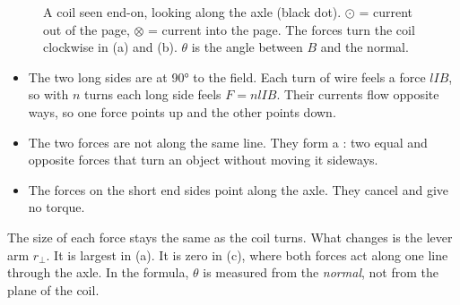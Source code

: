 \begin{figure}
  \caption{A coil seen end-on, looking along the axle (black dot). $\odot$ = current out
    of the page, $\otimes$ = current into the page. The forces turn the coil clockwise in
    (a) and (b). $\theta$ is the angle between $B$ and the normal.}\label{ch5:fig:endon}
\end{figure}

\begin{itemize}
  \item The two long sides are at \ang{90} to the field. Each turn of wire feels a
        force $lIB$, so with $n$ turns each long side feels $F = nlIB$. Their currents
        flow opposite ways, so one force points up and the other points down.
  \item The two forces are not along the same line. They form a : two
        equal and opposite forces that turn an object without moving it sideways.
  \item The forces on the short end sides point along the axle. They cancel and give
        no torque.
\end{itemize}
The size of each force stays the same as the coil turns. What changes is the lever
arm $r_\perp$. It is largest in (a). It is zero in (c), where both forces act along one
line through the axle. In the formula, $\theta$ is measured from the \emph{normal},
not from the plane of the coil.

